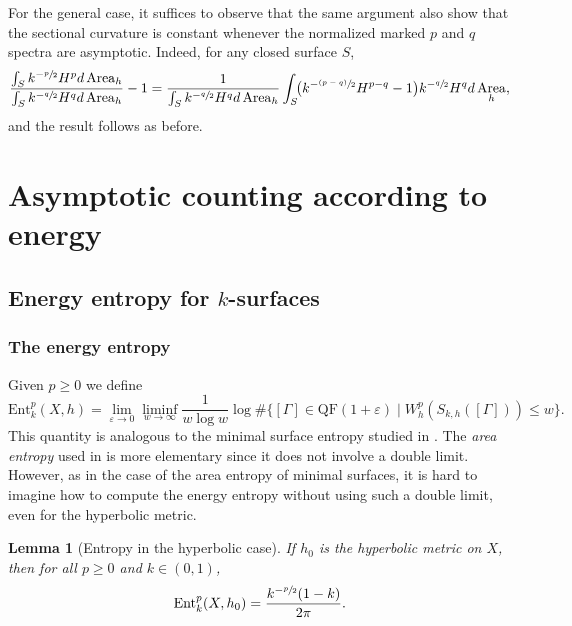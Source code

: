 \documentclass[10pt]{amsart}
\newcommand{\psfrac}[2]{\sfrac{(#1)}{#2}}
\newcommand{\ksurfaces}{$k$\nobreakdash-surfaces\xspace}
\theoremstyle{plain}
\newtheorem{lemma}[theorem]{Lemma}
\theoremstyle{definition}
\let\eps\varepsilon
\newcommand{\Ent}{\mathrm{Ent}}
\newcommand{\QF}{\mathrm{QF}}
\DeclareMathOperator{\Area}{Area}
\let\Subsection\subsection\let\Subsubsection\subsubsection
\begin{document}
For the general case, it suffices to observe that the same argument also show that the sectional curvature is constant whenever the normalized marked $p$ and $q$ spectra are asymptotic. Indeed, for any closed surface $S$,
\[
\frac{\int_S k^{-\sfrac{p}{2}}H^p d\Area_h}{\int_S k^{-\sfrac{q}{2}}H^qd\Area_h}-1
=\frac{1}{\int_Sk^{-\sfrac{q}{2}}H^qd\Area_h}\int_S\!\bigl(k^{-\psfrac{p-q}{2}}H^{p-q}-1\bigr)k^{-\sfrac{q}{2}} H^qd\Area_h,
\]
and the result follows as before.

\section{Asymptotic counting according to energy}
\Subsection{Energy entropy for \ksurfaces}
\subsubsection{The energy entropy} Given $p\geq 0$ we define
\begin{equation*}
\Ent^p_{k}(X,h)=\lim_{\eps\to 0}\liminf_{w\to\infty}\frac{1}{w\log w}\log\#\bigl\{[\Gamma]\in\QF(1+\eps)\mid W^{p}_{h}(S_{k,h}([\Gamma]))\leq w\bigr\}.
\end{equation*}
This quantity is analogous to the minimal surface entropy studied in \cite{CMN,ln21}. The \emph{area entropy} used in \cite{ALS} is more elementary since it does not involve a double limit. However, as in the case of the area entropy of minimal surfaces, it is hard to imagine how to compute the energy entropy without using such a double limit, even for the hyperbolic metric.

\begin{lemma}[Entropy in the hyperbolic case] If $h_0$ is the hyperbolic metric on $X$, then for all $p\geq 0$ and $k\in(0,1)$,
\begin{equation*}
\Ent^p_{k}(X,h_0)=\frac{k^{-\sfrac{p}{2}}(1-k)}{2\pi}.
\end{equation*}
\end{lemma}
\end{document}
